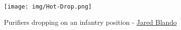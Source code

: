 \begin{figure}[!h]
  \centering
  \texttt{[image: img/Hot-Drop.png]}
  \caption*{Purifiers dropping on an infantry position - \href{https://jaredblando.com/}{Jared Blando}}
\end{figure}
